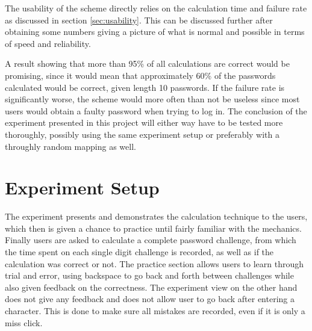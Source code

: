 \par The usability of the scheme directly relies on the calculation time and failure rate as discussed in section \ref{sec:usability}. This can be discussed further after obtaining some numbers giving a picture of what is normal and possible in terms of speed and reliability.
\par A result showing that more than 95\% of all calculations are correct would be promising, since it would mean that approximately 60\% of the passwords calculated would be correct, given length 10 passwords. If the failure rate is significantly worse, the scheme would more often than not be useless since most users would obtain a faulty password when trying to log in. The conclusion of the experiment presented in this project will either way have to be tested more thoroughly, possibly using the same experiment setup or preferably with a throughly random mapping as well. 



\section{Experiment Setup}
The experiment presents and demonstrates the calculation technique to the users, which then is given a chance to practice until fairly familiar with the mechanics. Finally users are asked to calculate a complete password challenge, from which the time spent on each single digit challenge is recorded, as well as if the calculation was correct or not. The practice section allows users to learn through trial and error, using backspace to go back and forth between challenges while also given feedback on the correctness. The experiment view on the other hand does not give any feedback and does not allow user to go back after entering a character. This is done to make sure all mistakes are recorded, even if it is only a miss click. 
